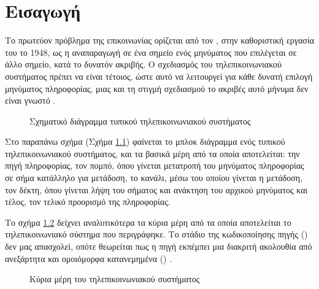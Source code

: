 \chapter{Εισαγωγή}
Το πρωτεύον πρόβλημα της επικοινωνίας ορίζεται από τον , στην καθοριστική εργασία του το 1948, ως η αναπαραγωγή σε ένα σημείο ενός μηνύματος που επιλέγεται σε άλλο σημείο, κατά το δυνατόν ακριβής. Ο σχεδιασμός του τηλεπικοινωνιακού συστήματος πρέπει να είναι τέτοιος, ώστε αυτό να λειτουργεί για κάθε δυνατή επιλογή μηνύματος πληροφορίας, μιας και τη στιγμή σχεδιασμού το ακριβές αυτό μήνυμα δεν είναι γνωστό \cite{shannon1948mathematical}.
\begin{figure}[h]
\caption{Σχηματικό διάγραμμα τυπικού τηλεπικοινωνιακού συστήματος}
\label{fig:telecom system}
\end{figure}

Στο παραπάνω σχήμα (Σχήμα \ref{fig:telecom system}) φαίνεται το μπλοκ διάγραμμα ενός τυπικού τηλεπικοινωνιακού συστήματος, και τα βασικά μέρη από τα οποία αποτελείται: την πηγή πληροφορίας, τον πομπό, όπου γίνεται μετατροπή του μηνύματος πληροφορίας σε σήμα κατάλληλο για μετάδοση, το κανάλι, μέσω του οποίου γίνεται η μετάδοση, τον δέκτη, όπου γίνεται λήψη του σήματος και ανάκτηση του αρχικού μηνύματος και τέλος, τον τελικό προορισμό της πληροφορίας.

Το σχήμα \ref{fig:telecom system 2} δείχνει αναλυτικότερα τα κύρια μέρη από τα οποία αποτελείται το τηλεπικοινωνιακό σύστημα που περιγράφηκε. Tο στάδιο της κωδικοποίησης πηγής () δεν μας απασχολεί, οπότε θεωρείται πως η πηγή εκπέμπει μια διακριτή ακολουθία από ανεξάρτητα και ομοιόμορφα κατανεμημένα () .

\en{\lipsum[1]}

\begin{figure}[h]
\caption{Κύρια μέρη του τηλεπικοινωνιακού συστήματος}
\label{fig:telecom system 2}
\end{figure}

